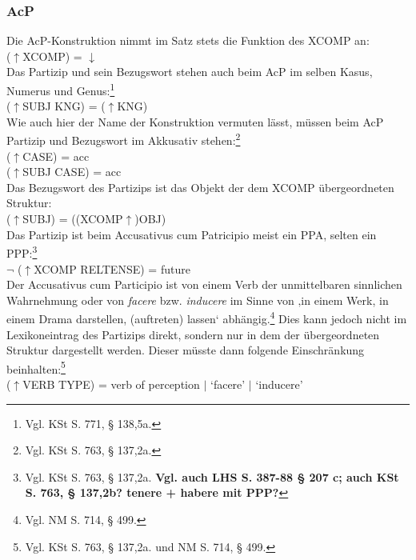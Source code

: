 \documentclass[12pt,a4paper]{article}
\begin{document}
\subsubsection{AcP}
Die AcP-Konstruktion nimmt im Satz stets die Funktion des XCOMP an: \\
($\uparrow$XCOMP) = $\downarrow$ \\
Das Partizip und sein Bezugswort stehen auch beim AcP im selben Kasus, Numerus und Genus:\footnote{Vgl. KSt S. 771, § 138,5a.}\\
($\uparrow$SUBJ KNG) = ($\uparrow$KNG)\\
Wie auch hier der Name der Konstruktion vermuten lässt, müssen beim AcP Partizip und Bezugswort im Akkusativ stehen:\footnote{Vgl. KSt S. 763, § 137,2a.} \\
($\uparrow$CASE) = acc \\
($\uparrow$SUBJ CASE) = acc \\
Das Bezugswort des Partizips ist das Objekt der dem XCOMP übergeordneten Struktur: \\
	($\uparrow$SUBJ) = ((XCOMP$\uparrow$)OBJ) \\
Das Partizip ist beim Accusativus cum Patricipio meist ein PPA, selten ein PPP:\footnote{Vgl. KSt S. 763, § 137,2a. \textbf{Vgl. auch LHS S. 387-88 § 207 c; auch KSt S. 763, § 137,2b? tenere + habere mit PPP?}} \\
$\neg$ ($\uparrow$XCOMP RELTENSE) = future \\
Der Accusativus cum Participio ist von einem Verb der unmittelbaren sinnlichen Wahrnehmung oder von \textit{facere} bzw. \textit{inducere} im Sinne von ‚in einem Werk, in einem Drama darstellen, (auftreten) lassen‘ abhängig.\footnote{Vgl. NM S. 714, § 499.} Dies kann jedoch nicht im Lexikoneintrag des Partizips direkt, sondern nur in dem der übergeordneten Struktur dargestellt werden. Dieser müsste dann folgende Einschränkung beinhalten:\footnote{Vgl. KSt S. 763, § 137,2a. und NM S. 714, § 499.} \\
($\uparrow$VERB TYPE) = verb of perception $\mid$ `facere' $\mid$ `inducere'
	
\end{document}
